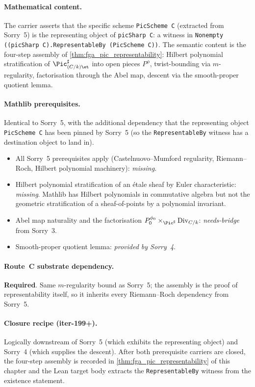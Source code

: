 \paragraph{Mathematical content.} The carrier asserts that the
specific scheme \texttt{PicScheme C} (extracted from Sorry~5) is the
representing object of \texttt{picSharp C}: a witness in
\texttt{Nonempty ((picSharp C).RepresentableBy (PicScheme C))}. The
semantic content is the four-step assembly of
\cref{thm:fga_pic_representability}: Hilbert polynomial
stratification of $\Pic^\sharp_{(C/k)\et}$ into open pieces
$P^\phi$, twist-bounding via $m$-regularity, factorisation through
the Abel map, descent via the smooth-proper quotient lemma.

\paragraph{Mathlib prerequisites.}
Identical to Sorry~5, with the additional dependency that the
representing object \texttt{PicScheme C} has been pinned by Sorry~5
(so the \texttt{RepresentableBy} witness has a destination object to
land in).
\begin{itemize}
  \item All Sorry~5 prerequisites apply (Castelnuovo--Mumford
    regularity, Riemann--Roch, Hilbert polynomial machinery):
    \emph{missing}.
  \item Hilbert polynomial stratification of an \'etale sheaf by
    Euler characteristic: \emph{missing}. Mathlib has Hilbert
    polynomials in commutative algebra but not the geometric stratification
    of a sheaf-of-points by a polynomial invariant.
  \item Abel map naturality and the factorisation
    $P^{\phi_0}_0 \times_{\Pic^\sharp} \mathrm{Div}_{C/k}$:
    \emph{needs-bridge} from Sorry~3.
  \item Smooth-proper quotient lemma: \emph{provided by Sorry~4}.
\end{itemize}

\paragraph{Route~C substrate dependency.} \textbf{Required}. Same
$m$-regularity bound as Sorry~5; the assembly is the proof of
representability itself, so it inherits every Riemann--Roch
dependency from Sorry~5.

\paragraph{Closure recipe (iter-199+).} Logically downstream of
Sorry~5 (which exhibits the representing object) and Sorry~4 (which
supplies the descent). After both prerequisite carriers are closed,
the four-step assembly is recorded in
\cref{thm:fga_pic_representability} of this chapter and the Lean
target body extracts the \texttt{RepresentableBy} witness from the
existence statement.

